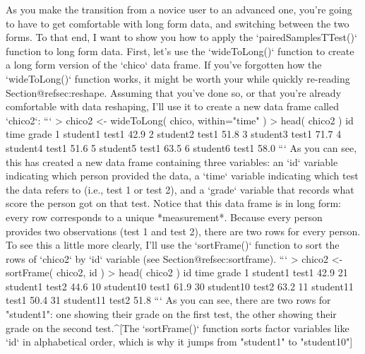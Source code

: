 As you make the transition from a novice user to an advanced one, you're going to have to get comfortable with long form data, and switching between the two forms. To that end, I want to show you how to apply the `pairedSamplesTTest()` function to long form data. First, let's use the `wideToLong()` function to create a long form version of the `chico` data frame. If you've forgotten how the  `wideToLong()` function works, it might be worth your while quickly re-reading Section@refsec:reshape. Assuming that you've done so, or that you're already comfortable with data reshaping, I'll use it to create a new data frame called `chico2`:
```
> chico2 <- wideToLong( chico, within="time" )
> head( chico2 )
        id  time grade
1 student1 test1  42.9
2 student2 test1  51.8
3 student3 test1  71.7
4 student4 test1  51.6
5 student5 test1  63.5
6 student6 test1  58.0
```
As you can see, this has created a new data frame containing three variables: an `id` variable indicating which person provided the data, a `time` variable indicating which test the data refers to (i.e., test 1 or test 2), and a `grade` variable that records what score the person got on that test. Notice that this data frame is in long form: every row corresponds to a unique *measurement*. Because every person provides two observations (test 1 and test 2), there are two rows for every person. To see this a little more clearly, I'll use the `sortFrame()` function to sort the rows of `chico2` by `id` variable (see Section@refsec:sortframe).
```
> chico2 <- sortFrame( chico2, id )
> head( chico2 )
          id  time grade
1   student1 test1  42.9
21  student1 test2  44.6
10 student10 test1  61.9
30 student10 test2  63.2
11 student11 test1  50.4
31 student11 test2  51.8
```
As you can see, there are two rows for "student1": one showing their grade on the first test, the other showing their grade on the second test.^[The `sortFrame()` function sorts factor variables like `id` in alphabetical order, which is why it jumps from "student1" to "student10"] 

